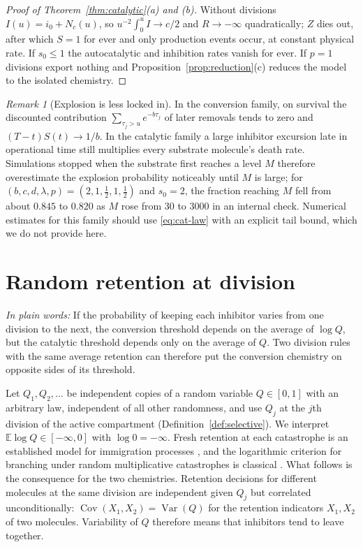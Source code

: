 \documentclass[11pt,a4paper]{article}
\numberwithin{equation}{section}
\theoremstyle{definition}\newtheorem{definition}[theorem]{Definition}
\theoremstyle{remark}\newtheorem{remark}[theorem]{Remark}\newtheorem{example}[theorem]{Example}
\newcommand{\E}{\mathbb E}
\newcommand{\Var}{\operatorname{Var}}
\newcommand{\takeaway}[1]{\par\smallskip\noindent\textit{In plain words:} #1\par\smallskip}
\begin{document}
\begin{proof}[Proof of Theorem~\ref{thm:catalytic}(a) and (b)]
Without divisions $I(u)=i_0+N_c(u)$, so $u^{-2}\int_0^uI\to c/2$ and $R\to-\infty$ quadratically; $Z$ dies out, after which $S=1$ for ever and only production events occur, at constant physical rate. If $s_0\le1$ the autocatalytic and inhibition rates vanish for ever. If $p=1$ divisions export nothing and Proposition~\ref{prop:reduction}(c) reduces the model to the isolated chemistry.
\end{proof}

\begin{remark}[Explosion is less locked in]\label{rem:cat-fragile}
In the conversion family, on survival the discounted contribution $\sum_{\tau_j>u}e^{-b\tau_j}$ of later removals tends to zero and $(T-t)S(t)\to1/b$. In the catalytic family a large inhibitor excursion late in operational time still multiplies every substrate molecule's death rate. Simulations stopped when the substrate first reaches a level $M$ therefore overestimate the explosion probability noticeably until $M$ is large; for $(b,c,d,\lambda,p)=(2,1,\tfrac12,1,\tfrac12)$ and $s_0=2$, the fraction reaching $M$ fell from about $0.845$ to $0.820$ as $M$ rose from $30$ to $3000$ in an internal check. Numerical estimates for this family should use \eqref{eq:cat-law} with an explicit tail bound, which we do not provide here.
\end{remark}
\section{Random retention at division}\label{sec:randomQ}
\takeaway{If the probability of keeping each inhibitor varies from one division to the next, the conversion threshold depends on the average of $\log Q$, but the catalytic threshold depends only on the average of $Q$. Two division rules with the same average retention can therefore put the conversion chemistry on opposite sides of its threshold.}

Let $Q_1,Q_2,\dots$ be independent copies of a random variable $Q\in[0,1]$ with an arbitrary law, independent of all other randomness, and use $Q_j$ at the $j$th division of the active compartment (Definition~\ref{def:selective}). We interpret $\E\log Q\in[-\infty,0]$ with $\log0=-\infty$. Fresh retention at each catastrophe is an established model for immigration processes \cite{GalloRoldanCorrea2026}, and the logarithmic criterion for branching under random multiplicative catastrophes is classical \cite{BansayePardoSmadi2013,HermannPfaffelhuber2020}. What follows is the consequence for the two chemistries. Retention decisions for different molecules at the same division are independent given $Q_j$ but correlated unconditionally: $\operatorname{Cov}(X_1,X_2)=\Var(Q)$ for the retention indicators $X_1,X_2$ of two molecules. Variability of $Q$ therefore means that inhibitors tend to leave together.
\end{document}
